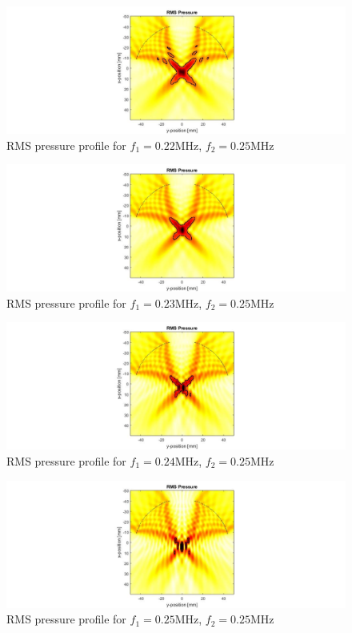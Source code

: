 \documentclass[10pt,a4paper]{article}
\begin{document}
\begin{figure}[!h]\label{f220kHz}
\hspace*{-5cm}                                                    
\includegraphics[scale=0.6]{f220kHz}
\caption{RMS pressure profile for $f_1 = 0.22$MHz, $f_2 = 0.25$MHz}
\end{figure}
\begin{figure}[!h]\label{f230kHz}
\hspace*{-5cm}                                                    
\includegraphics[scale=0.6]{f230kHz}
\caption{RMS pressure profile for $f_1 = 0.23$MHz, $f_2 = 0.25$MHz}
\end{figure}
\begin{figure}[!h]\label{f240kHz}
\hspace*{-5cm}                                                    
\includegraphics[scale=0.6]{f240kHz}
\caption{RMS pressure profile for $f_1 = 0.24$MHz, $f_2 = 0.25$MHz}
\end{figure}
\begin{figure}[!h]\label{f250kHz}
\hspace*{-5cm}                                                    
\includegraphics[scale=0.6]{f250kHz}
\caption{RMS pressure profile for $f_1 = 0.25$MHz, $f_2 = 0.25$MHz}
\end{figure}
\end{document}
